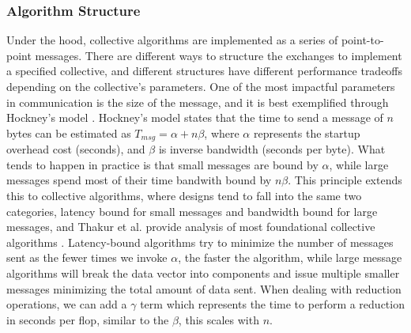 \subsubsection{Algorithm Structure}\label{sec:CH2-MPI-AlgStructure}
Under the hood, collective algorithms are implemented as a series of point-to-point messages. 
There are different ways to structure the exchanges to implement a specified collective, and different structures have different performance tradeoffs depending on the collective's parameters.
One of the most impactful parameters in communication is the size of the message, and it is best exemplified through Hockney's model \cite{Hockney1994HockenyModel}.
Hockney's model states that the time to send a message of $n$ bytes can be estimated as $T_{msg}=\alpha+n\beta$, where $\alpha$ represents the startup overhead cost (seconds), and $\beta$ is inverse bandwidth (seconds per byte).
What tends to happen in practice is that small messages are bound by $\alpha$, while large messages spend most of their time bandwith bound by $n\beta$.
This principle extends this to collective algorithms, where designs tend to fall into the same two categories, latency bound for small messages and bandwidth bound for large messages, and Thakur et al. provide analysis of most foundational collective algorithms \cite{Thakur2005OptMPICH}.
Latency-bound algorithms try to minimize the number of messages sent as the fewer times we invoke $\alpha$, the faster the algorithm, while large message algorithms will break the data vector into components and issue multiple smaller messages minimizing the total amount of data sent.
When dealing with reduction operations, we can add a $\gamma$ term which represents the time to perform a reduction in seconds per flop, similar to the $\beta$, this scales with $n$.

